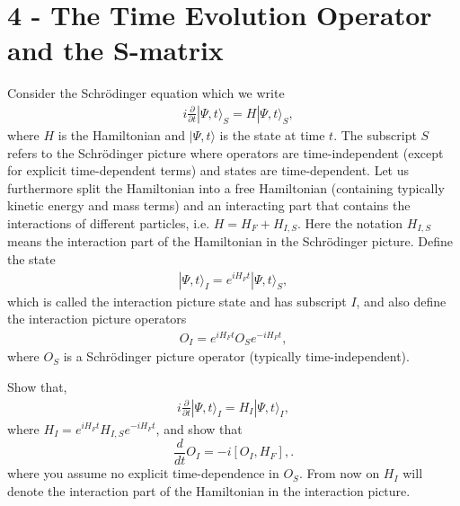 \documentclass[working, oneside]{../../Preambles/tuftebook}
\begin{document}
\let\cleardoublepage\clearpage
\thispagestyle{fancy}
\chapter{4 - The Time Evolution Operator and the S-matrix}
Consider the Schrödinger equation which we write
\begin{align*}
&i \frac{\partial}{\partial t} |\Psi, t\rangle_S = H |\Psi, t\rangle_S, \tag{44}
\end{align*}
where \(H\) is the Hamiltonian and \(|\Psi, t\rangle\) is the state at time \(t\). The subscript \(S\) refers to the Schrödinger picture where operators are time-independent (except for explicit time-dependent terms) and states are time-dependent. Let us furthermore split the Hamiltonian into a free Hamiltonian (containing typically kinetic energy and mass terms) and an interacting part that contains the interactions of different particles, i.e. \(H = H_F + H_{I,S}\). Here the notation \(H_{I,S}\) means the interaction part of the Hamiltonian in the Schrödinger picture. Define the state
\begin{align*}
|\Psi, t\rangle_I = e^{i H_F t} |\Psi, t\rangle_S, \tag{45}
\end{align*}
which is called the interaction picture state and has subscript \(I\), and also define the interaction picture operators
\begin{align*}
O_I = e^{i H_F t} O_S e^{-i H_F t}, \tag{46}
\end{align*}
where \(O_S\) is a Schrödinger picture operator (typically time-independent).
\begin{exercise}[1]
Show that,
\begin{align*}
i \frac{\partial}{\partial t} |\Psi, t\rangle_I = H_I |\Psi, t\rangle_I, \tag{47}
\end{align*}
where $H_I = e^{i H_F t} H_{I,S} e^{-i H_F t}$, and show that 
\[
\frac{d}{dt} O_I = -i [O_I, H_F], \tag{48}
.\] 
where you assume no explicit time-dependence in \(O_S\). From now on \(H_I\) will denote the interaction part of the Hamiltonian in the interaction picture.
\end{exercise}
\end{document}
